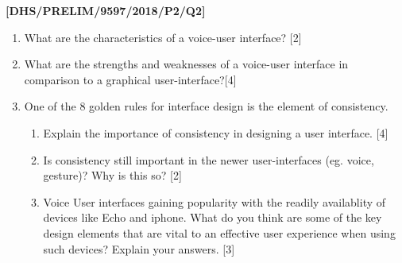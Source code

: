 \item \textbf{{[}DHS/PRELIM/9597/2018/P2/Q2{]} }
\begin{enumerate}
\item What are the characteristics of a voice-user interface? \hfill{}{[}2{]}
\item What are the strengths and weaknesses of a voice-user interface in
comparison to a graphical user-interface?\hfill{}{[}4{]}
\item One of the 8 golden rules for interface design is the element of consistency. 
\begin{enumerate}
\item Explain the importance of consistency in designing a user interface.
\hfill{}{[}4{]}
\item Is consistency still important in the newer user-interfaces (eg. voice,
gesture)? Why is this so?\hfill{} {[}2{]}
\item Voice User interfaces gaining popularity with the readily availablity
of devices like Echo and iphone. What do you think are some of the
key design elements that are vital to an effective user experience
when using such devices? Explain your answers.\hfill{} {[}3{]}
\end{enumerate}
\end{enumerate}